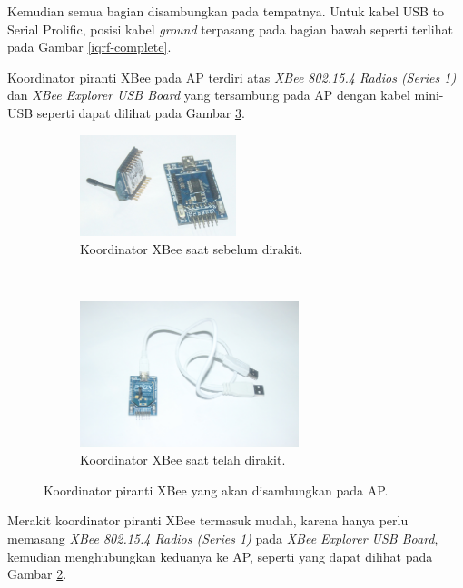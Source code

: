 			Kemudian semua bagian disambungkan pada tempatnya. Untuk kabel USB to Serial Prolific, posisi kabel \emph{ground} terpasang pada bagian bawah seperti terlihat pada Gambar \ref{iqrf-complete}.

			Koordinator piranti XBee pada AP terdiri atas \emph{XBee 802.15.4 Radios (Series 1)} dan \emph{XBee Explorer USB Board} yang tersambung pada AP dengan kabel mini-USB seperti dapat dilihat pada Gambar \ref{xbee-sink}.

			\begin{figure}[H]
				\begin{subfigure}[b]{\textwidth}
					\centering
				    \includegraphics[width=0.5\textwidth]{gambar/xbee-sink-stripped}
				    \caption{Koordinator XBee saat sebelum dirakit.}
				    \label{xbee-sink-stripped}
				\end{subfigure}
				 ~
				\begin{subfigure}[b]{\textwidth}
					\centering
				    \includegraphics[width=0.7\textwidth]{gambar/xbee-sink-complete}
				    \caption{Koordinator XBee saat telah dirakit.}
				    \label{xbee-sink-complete}
				\end{subfigure}
				\caption{Koordinator piranti XBee yang akan disambungkan pada AP.}
				\label{xbee-sink}
			\end{figure}

			Merakit koordinator piranti XBee termasuk mudah, karena hanya perlu memasang \emph{XBee 802.15.4 Radios (Series 1)} pada \emph{XBee Explorer USB Board}, kemudian menghubungkan keduanya ke AP, seperti yang dapat dilihat pada Gambar \ref{xbee-sink-complete}.

